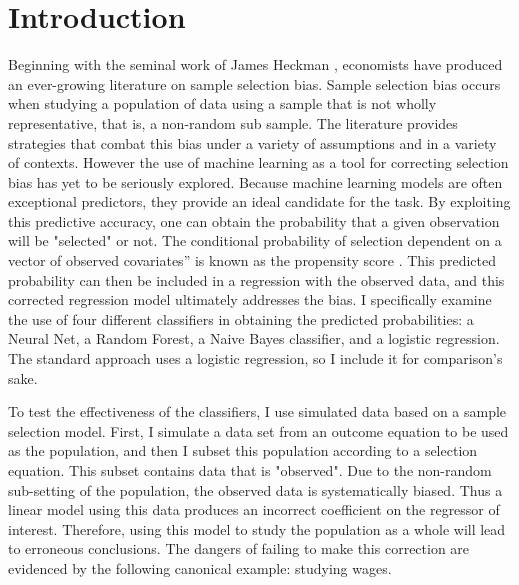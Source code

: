 \documentclass[12pt,english]{article}
\begin{document}
\section{Introduction}
Beginning with the seminal work of James Heckman \cite{heckman_1979}, economists have produced an ever-growing literature on sample selection bias. Sample selection bias occurs when studying a population of data using a sample that is not wholly representative, that is, a non-random sub sample. The literature provides strategies that combat this bias under a variety of assumptions and in a variety of contexts. However the use of machine learning as a tool for correcting selection bias has yet to be seriously explored. Because machine learning models are often exceptional predictors, they provide an ideal candidate for the task. By exploiting this predictive accuracy, one can obtain the probability that a given observation will be "selected" or not. The conditional probability of selection dependent on a vector of observed covariates” is known as the propensity score \cite{rosenbaum_rubin_1983}. This predicted probability can then be included in a regression with the observed data, and this corrected regression model ultimately addresses the bias. I specifically examine the use of four different classifiers in obtaining the predicted probabilities: a Neural Net, a Random Forest, a Naive Bayes classifier, and a logistic regression. The standard approach uses a logistic regression, so I include it for comparison's sake.
\par
To test the effectiveness of the classifiers, I use simulated data based on a sample selection model. First, I simulate a data set from an outcome equation to be used as the population, and then I subset this population according to a selection equation. This subset contains data that is "observed". Due to the non-random sub-setting of the population, the observed data is systematically biased. Thus a linear model using this data produces an incorrect coefficient on the regressor of interest. Therefore, using this model to study the population as a whole will lead to erroneous conclusions. The dangers of failing to make this correction are evidenced by the following canonical example: studying wages.
\par
\end{document}
